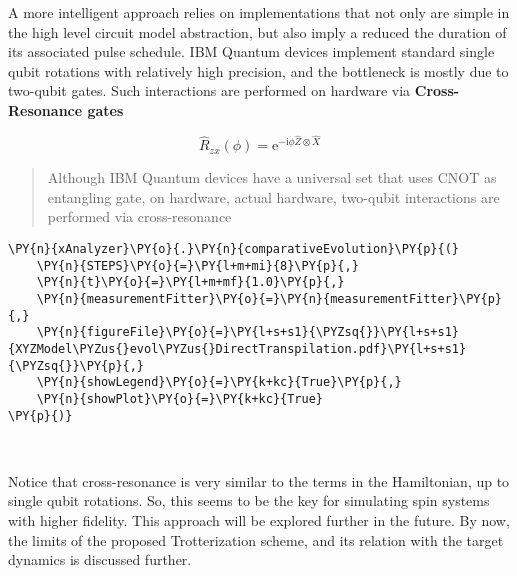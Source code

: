 A more intelligent approach relies on implementations that not only are
simple in the high level circuit model abstraction, but also imply a
reduced the duration of its associated pulse schedule. IBM Quantum
devices implement standard single qubit rotations with relatively high
precision, and the bottleneck is mostly due to two-qubit gates. Such
interactions are performed on hardware via \textbf{Cross-Resonance
gates}

\[
\hat{R}_{zx}(\phi) = \mathrm{e}^{-\mathrm{i}\phi\hat{Z}\otimes\hat{X}}
\]

\begin{quote}
Although IBM Quantum devices have a universal set that uses CNOT as
entangling gate, on hardware, actual hardware, two-qubit interactions
are performed via cross-resonance
\end{quote}

    \begin{tcolorbox}[breakable, size=fbox, boxrule=1pt, pad at break*=1mm,colback=cellbackground, colframe=cellborder]
\begin{Verbatim}[commandchars=\\\{\}]
\PY{n}{xAnalyzer}\PY{o}{.}\PY{n}{comparativeEvolution}\PY{p}{(}
    \PY{n}{STEPS}\PY{o}{=}\PY{l+m+mi}{8}\PY{p}{,} 
    \PY{n}{t}\PY{o}{=}\PY{l+m+mf}{1.0}\PY{p}{,}
    \PY{n}{measurementFitter}\PY{o}{=}\PY{n}{measurementFitter}\PY{p}{,}
    \PY{n}{figureFile}\PY{o}{=}\PY{l+s+s1}{\PYZsq{}}\PY{l+s+s1}{XYZModel\PYZus{}evol\PYZus{}DirectTranspilation.pdf}\PY{l+s+s1}{\PYZsq{}}\PY{p}{,}
    \PY{n}{showLegend}\PY{o}{=}\PY{k+kc}{True}\PY{p}{,}
    \PY{n}{showPlot}\PY{o}{=}\PY{k+kc}{True}
\PY{p}{)}
\end{Verbatim}
\end{tcolorbox}

    \begin{center}
    \end{center}
    { \hspace*{\fill} \\}
    
    Notice that cross-resonance is very similar to the terms in the
Hamiltonian, up to single qubit rotations. So, this seems to be the key
for simulating spin systems with higher fidelity. This approach will be
explored further in the future. By now, the limits of the proposed
Trotterization scheme, and its relation with the target dynamics is
discussed further.

